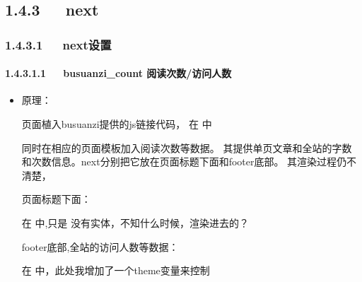 \documentclass[letterpaper,12pt,english]{sphinxmanual}
\begin{document}
\subsection{1.4.3   next}
\label{\detokenize{001software/001install/001._u7f51_u7ad9/hexo:next}}

\subsubsection{1.4.3.1   next\sphinxhyphen{}设置}
\label{\detokenize{001software/001install/001._u7f51_u7ad9/hexo:id4}}

\paragraph{1.4.3.1.1   busuanzi\_count 阅读次数/访问人数}
\label{\detokenize{001software/001install/001._u7f51_u7ad9/hexo:busuanzi-count}}\begin{itemize}
\item {} 
原理：

页面植入busuanzi提供的js链接代码，
在  中

\begin{sphinxVerbatim}[commandchars=\\\{\}]
    
\end{sphinxVerbatim}

同时在相应的页面模板加入阅读次数等数据。
其提供单页文章和全站的字数和次数信息。next分别把它放在页面标题下面和footer底部。
其渲染过程仍不清楚，

页面标题下面：

在  中,只是   没有实体，不知什么时候，渲染进去的？

footer底部,全站的访问人数等数据：

在   中，此处我增加了一个theme变量来控制

\begin{sphinxVerbatim}[commandchars=\\\{\}]
     
\end{sphinxVerbatim}

\end{itemize}
\end{document}
